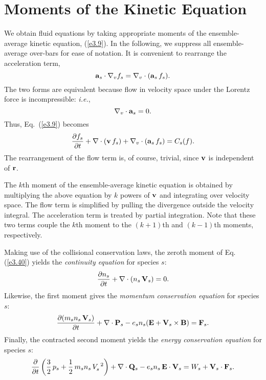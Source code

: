 \section{Moments of the Kinetic Equation}
We obtain fluid equations by taking appropriate moments of the ensemble-average 
kinetic equation, (\ref{e3.9}). In the following, we suppress all ensemble-average over-bars
for ease of notation. It is convenient to rearrange the acceleration
term,
\begin{equation}
{\bf a}_s\cdot\nabla_v f_s = \nabla_v\cdot({\bf a}_s\,f_s).
\end{equation}
The two forms are equivalent  because flow in velocity space under the
Lorentz force is incompressible: {\em i.e.},
\begin{equation}
\nabla_v\cdot {\bf a}_s = 0.
\end{equation}
Thus, Eq.~(\ref{e3.9}) becomes
\begin{equation}\label{e3.40}
\frac{\partial f_s}{\partial t} + 
\nabla\cdot({\bf v}\,f_s) +\nabla_v\cdot({\bf a}_s\,f_s) = C_s(f).
\end{equation}
The rearrangement of the flow term is, of course, trivial, since ${\bf v}$
is independent of ${\bf r}$. 

The $k$th moment of the ensemble-average kinetic equation is obtained
by multiplying the above equation by $k$ powers of ${\bf v}$ and integrating
over velocity space. The flow term is simplified by pulling the
divergence outside the velocity integral. The acceleration term is treated by partial
integration. Note that these two terms couple the $k$th moment
to the $(k+1)$th and $(k-1)$th moments, respectively. 

Making use of the collisional conservation laws, the zeroth moment of Eq. (\ref{e3.40})
yields the {\em continuity equation}\/ for species $s$:
\begin{equation}\label{e3.41}
\frac{\partial n_s}{\partial t} + \nabla\cdot(n_s\,{\bf V}_s) = 0.
\end{equation}
Likewise, the first moment gives the {\em momentum conservation equation}\/
for species $s$:
\begin{equation}\label{e3.42}
\frac{\partial(m_s n_s\,{\bf V}_s)}{\partial t}
+ \nabla\cdot{\bf P}_s -e_s n_s({\bf E} + {\bf V}_s\times {\bf B}) ={\bf F}_s.
\end{equation}
Finally, the contracted second moment yields the {\em energy conservation
equation}\/ for species $s$:
\begin{equation}\label{e3.43}
\frac{\partial}{\partial t}\left( \frac{3}{2}\,p_s + \frac{1}{2}\,m_s n_s\,V_s^{~2}
\right) + \nabla\cdot{\bf Q}_s - e_s n_s\,{\bf E}\cdot{\bf V}_s = W_s
+ {\bf V}_s\cdot {\bf F}_s.
\end{equation}

